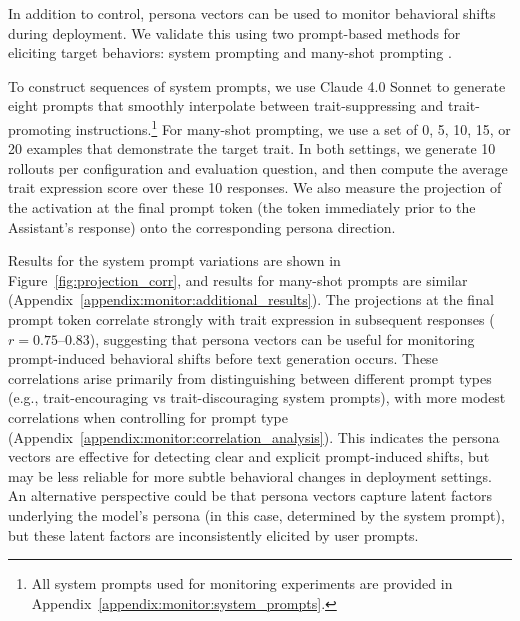 In addition to control, persona vectors can be used to monitor behavioral shifts during deployment. We validate this using two prompt-based methods for eliciting target behaviors: system prompting and many-shot prompting \citep{anil2024manyshot}.

To construct sequences of system prompts, we use Claude 4.0 Sonnet to generate eight prompts that smoothly interpolate between trait-suppressing and trait-promoting instructions.\footnote{All system prompts used for monitoring experiments are provided in Appendix~\ref{appendix:monitor:system_prompts}.}
For many-shot prompting, we use a set of 0, 5, 10, 15, or 20 examples that demonstrate the target trait.
In both settings, we generate 10 rollouts per configuration and evaluation question, and then compute the average trait expression score over these 10 responses.
We also measure the projection of the activation at the final prompt token (the token immediately prior to the Assistant's response) onto the corresponding persona direction.

Results for the system prompt variations are shown in Figure~\ref{fig:projection_corr}, and results for many-shot prompts are similar (Appendix~\ref{appendix:monitor:additional_results}).
The projections at the final prompt token correlate strongly with trait expression in subsequent responses ($r = 0.75\text{--}0.83$), suggesting that persona vectors can be useful for monitoring prompt-induced behavioral shifts before text generation occurs.
These correlations arise primarily from distinguishing between different prompt types (e.g., trait-encouraging vs trait-discouraging system prompts), with more modest correlations when controlling for prompt type (Appendix~\ref{appendix:monitor:correlation_analysis}).
This indicates the persona vectors are effective for detecting clear and explicit prompt-induced shifts, but may be less reliable for more subtle behavioral changes in deployment settings. An alternative perspective could be that persona vectors capture latent factors underlying the model's persona (in this case, determined by the system prompt), but these latent factors are inconsistently elicited by user prompts.
